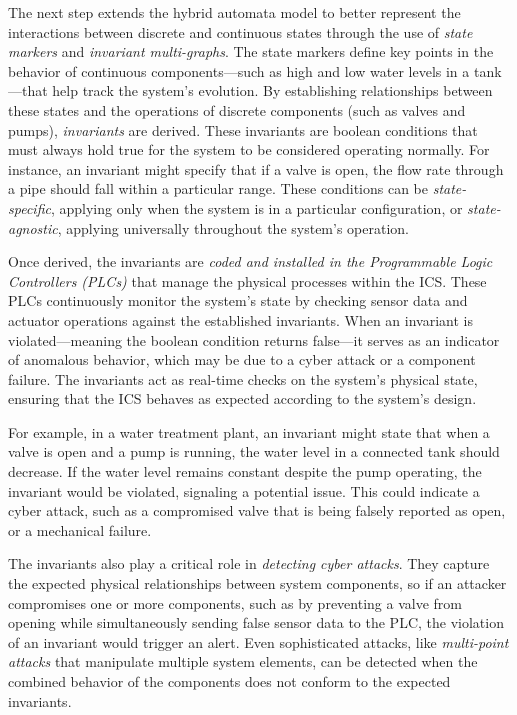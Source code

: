 The next step extends the hybrid automata model to better represent the interactions between discrete and continuous states through the use of \textit{state markers} and \textit{invariant multi-graphs}. The state markers define key points in the behavior of continuous components—such as high and low water levels in a tank—that help track the system's evolution. By establishing relationships between these states and the operations of discrete components (such as valves and pumps), \textit{invariants} are derived. These invariants are boolean conditions that must always hold true for the system to be considered operating normally. For instance, an invariant might specify that if a valve is open, the flow rate through a pipe should fall within a particular range. These conditions can be \textit{state-specific}, applying only when the system is in a particular configuration, or \textit{state-agnostic}, applying universally throughout the system's operation.

Once derived, the invariants are \textit{coded and installed in the Programmable Logic Controllers (PLCs)} that manage the physical processes within the ICS. These PLCs continuously monitor the system's state by checking sensor data and actuator operations against the established invariants. When an invariant is violated—meaning the boolean condition returns false—it serves as an indicator of anomalous behavior, which may be due to a cyber attack or a component failure. The invariants act as real-time checks on the system's physical state, ensuring that the ICS behaves as expected according to the system's design.

For example, in a water treatment plant, an invariant might state that when a valve is open and a pump is running, the water level in a connected tank should decrease. If the water level remains constant despite the pump operating, the invariant would be violated, signaling a potential issue. This could indicate a cyber attack, such as a compromised valve that is being falsely reported as open, or a mechanical failure.

The invariants also play a critical role in \textit{detecting cyber attacks}. They capture the expected physical relationships between system components, so if an attacker compromises one or more components, such as by preventing a valve from opening while simultaneously sending false sensor data to the PLC, the violation of an invariant would trigger an alert. Even sophisticated attacks, like \textit{multi-point attacks} that manipulate multiple system elements, can be detected when the combined behavior of the components does not conform to the expected invariants.

